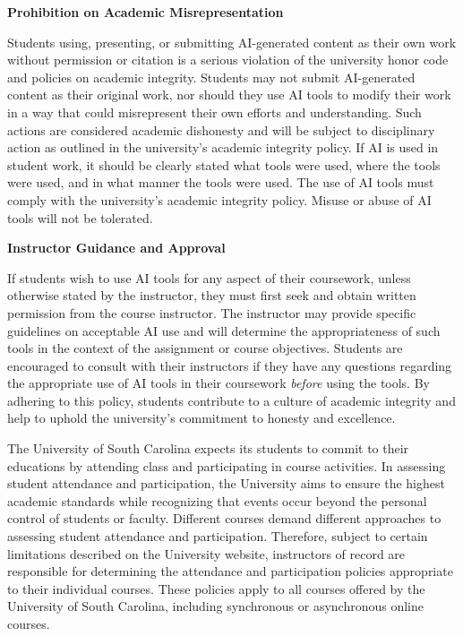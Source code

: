 \documentclass[11pt,letterpaper]{article}
\begin{document}
{\bfseries Prohibition on Academic Misrepresentation} \par
Students using, presenting, or submitting AI-generated content as their own work without permission or citation is a serious violation of the university honor code and policies on academic integrity. Students may not submit AI-generated content as their original work, nor should they use AI tools to modify their work in a way that could misrepresent their own efforts and understanding. Such actions are considered academic dishonesty and will be subject to disciplinary action as outlined in the university's academic integrity policy. If AI is used in student work, it should be clearly stated what tools were used, where the tools were used, and in what manner the tools were used. The use of AI tools must comply with the university's academic integrity policy. Misuse or abuse of AI tools will not be tolerated. \pspace

{\bfseries Instructor Guidance and Approval} \par
If students wish to use AI tools for any aspect of their coursework, unless otherwise stated by the instructor, they must first seek and obtain written permission from the course instructor. The instructor may provide specific guidelines on acceptable AI use and will determine the appropriateness of such tools in the context of the assignment or course objectives. Students are encouraged to consult with their instructors if they have any questions regarding the appropriate use of AI tools in their coursework \textit{before} using the tools. By adhering to this policy, students contribute to a culture of academic integrity and help to uphold the university's commitment to honesty and excellence. \sectionbreak




The University of South Carolina expects its students to commit to their educations by attending class and participating in course activities. In assessing student attendance and participation, the University aims to ensure the highest academic standards while recognizing that events occur beyond the personal control of students or faculty. Different courses demand different approaches to assessing student attendance and participation. Therefore, subject to certain limitations described on the University website, instructors of record are responsible for determining the attendance and participation policies appropriate to their individual courses. These policies apply to all courses offered by the University of South Carolina, including synchronous or asynchronous online courses. \pspace
\end{document}
